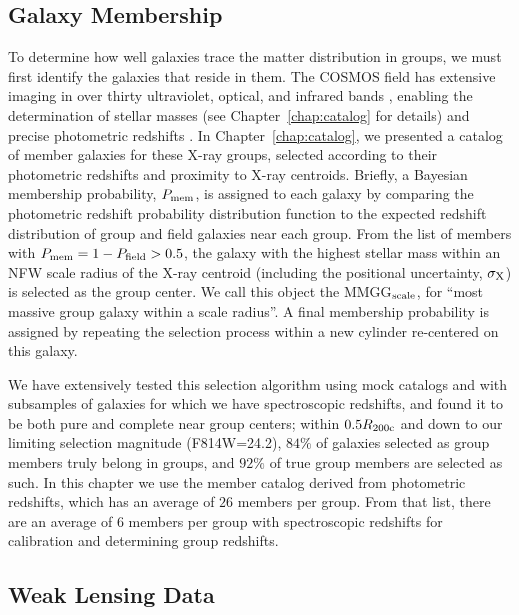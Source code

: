 \subsection{Galaxy Membership}
\label{cen_s:membership}

To determine how well galaxies trace the matter distribution in
groups, we must first identify the galaxies that reside in them. The
COSMOS field has extensive imaging in over thirty ultraviolet,
optical, and infrared bands \citep{Capak2007b}, enabling the
determination of stellar masses (see Chapter~\ref{chap:catalog} for details) and precise
photometric redshifts \citep[][and Chapter~\ref{chap:catalog} for further
tests]{Ilbert2009}. In Chapter~\ref{chap:catalog}, we presented a catalog of member
galaxies for these X-ray groups, selected according to their
photometric redshifts and proximity to X-ray centroids. Briefly, a
Bayesian membership probability, $P_{\rm mem}$, is assigned to each
galaxy by comparing the photometric redshift probability distribution
function to the expected redshift distribution of group and field
galaxies near each group. From the list of members with $P_{\rm mem}=1-P_{\rm
  field}>0.5$, the galaxy with the highest stellar mass within an NFW
scale radius of the X-ray centroid (including the positional
uncertainty, $\sigma_{\rm X}$) is selected as the group center. We
call this object the MMGG$_{\rm scale}$, for ``most massive group galaxy
within a scale radius''. A final membership probability is assigned by
repeating the selection process within a new cylinder re-centered on
this galaxy.

We have extensively tested this selection algorithm using mock
catalogs and with subsamples of galaxies for which we have
spectroscopic redshifts, and found it to be both pure and complete
near group centers; within $0.5 R_{\rm 200c}$ and down to our limiting
selection magnitude (F814W=24.2), $84\%$ of galaxies selected as group
members truly belong in groups, and $92\%$ of true group members are
selected as such. In this chapter we use the member catalog derived from
photometric redshifts, which has an average of $26$ members per
group. From that list, there are an average of $6$ members per group
with spectroscopic redshifts for calibration and determining group
redshifts.

\subsection{Weak Lensing Data}

